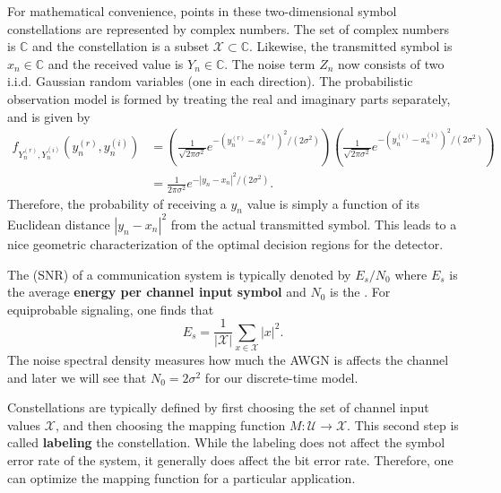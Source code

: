 For mathematical convenience, points in these two-dimensional symbol constellations are represented by complex numbers.
The set of complex numbers is $\mathbb{C}$ and the constellation is a subset $\mathcal{X}\subset\mathbb{C}$.
Likewise, the transmitted symbol is $x_n \in \mathbb{C}$ and the received value is $Y_n \in \mathbb{C}$.
The noise term $Z_n$ now consists of two i.i.d. Gaussian random variables (one in each direction).
The probabilistic observation model is formed by treating the real and imaginary parts separately, and is given by
\begin{align*}
f_{Y^{(r)}_n,Y^{(i)}_n}(y^{(r)}_n,y^{(i)}_n) & =
\left( \frac{1}{\sqrt{2\pi \sigma^2}} e^{-\left(y^{(r)}_n - x^{(r)}_n\right)^2 / (2\sigma^2)} \right)
\left( \frac{1}{\sqrt{2\pi \sigma^2}} e^{-\left(y^{(i)}_n - x^{(i)}_n\right)^2 / (2\sigma^2)} \right) \\
& =  \frac{1}{2\pi \sigma^2} e^{-\left|y_n - x_n\right|^2 / (2\sigma^2)}.
\end{align*}
Therefore, the probability of receiving a $y_n$ value is simply a function of its Euclidean distance $\left| y_n - x_n \right|^2$ from the actual transmitted symbol.
This leads to a nice geometric characterization of the optimal decision regions for the detector.

The  (SNR) of a communication system is typically denoted by $E_s / N_0$ where $E_s$ is the average \textbf{energy per channel input symbol} and $N_0$ is the .
For equiprobable signaling, one finds that
\[ E_s = \frac{1}{|\mathcal{X}|} \sum_{x\in \mathcal{X}} |x|^2. \]
The noise spectral density measures how much the AWGN is affects the channel and later we will see that $N_0 = 2 \sigma^2$ for our discrete-time model.

Constellations are typically defined by first choosing the set of channel input values $\mathcal{X}$, and then choosing the mapping function $M:\mathcal{U} \rightarrow \mathcal{X}$.
This second step is called \textbf{labeling} the constellation.
While the labeling does not affect the symbol error rate of the system, it generally does affect the bit error rate.
Therefore, one can optimize the mapping function for a particular application.

